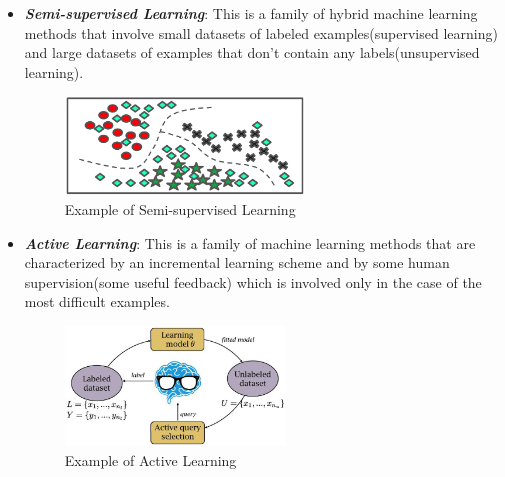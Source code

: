 \begin{itemize}
      \item \emph{\textbf{Semi-supervised Learning}}: This is a family
            of hybrid machine learning methods that involve small
            datasets of labeled examples(supervised learning) and large
            datasets of examples that don't contain any
            labels(unsupervised learning).

            \vspace{5mm}

            \begin{figure}[h]
                  \centering
                  \includegraphics[width=0.6\textwidth]{../img/Semi_supervised_learning}
                  \caption{Example of Semi-supervised Learning}
            \end{figure}

            \vspace{5mm}

            \newpage

      \item \emph{\textbf{Active Learning}}: This is a family of machine
            learning methods that are characterized by an incremental
            learning scheme and by some human supervision(some useful
            feedback) which is involved only in the case of the most
            difficult examples.

            \vspace{5mm}

            \begin{figure}[h]
                  \centering
                  \includegraphics[width=0.55\textwidth]{../img/Active_learning}
                  \caption{Example of Active Learning}
            \end{figure}

            \vspace{5mm}
\end{itemize}

